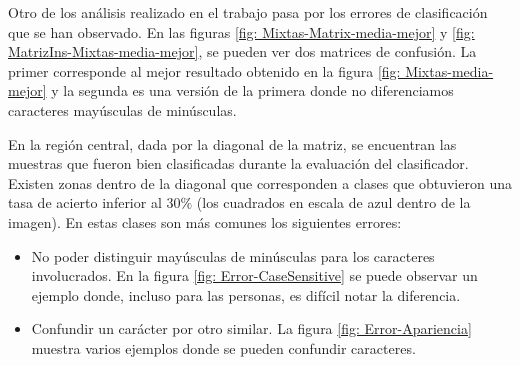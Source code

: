 	Otro de los análisis realizado en el trabajo pasa por los errores de clasificación que se han observado. En las figuras \ref{fig: Mixtas-Matrix-media-mejor} y \ref{fig: MatrizIns-Mixtas-media-mejor}, se pueden ver dos matrices de confusión. La primer corresponde al mejor resultado obtenido en la figura \ref{fig: Mixtas-media-mejor} y la segunda es una versión de la primera donde no diferenciamos caracteres mayúsculas de minúsculas.

	En la región central, dada por la diagonal de la matriz, se encuentran las muestras que fueron bien clasificadas durante la evaluación del clasificador. Existen zonas dentro de la diagonal que corresponden a clases que obtuvieron una tasa de acierto inferior al $30\%$ (los cuadrados en escala de azul dentro de la imagen). En estas clases son más comunes los siguientes errores:

	\begin{itemize}
		\item No poder distinguir mayúsculas de minúsculas para los caracteres involucrados. En la figura \ref{fig: Error-CaseSensitive} se puede observar un ejemplo donde, incluso para las personas, es difícil notar la diferencia.
		\item Confundir un carácter por otro similar. La figura \ref{fig: Error-Apariencia} muestra varios ejemplos donde se pueden confundir caracteres.
	\end{itemize}

